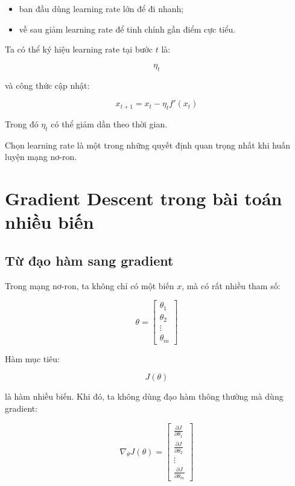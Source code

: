 \documentclass[12pt,a4paper]{report}
\begin{document}
\begin{itemize}
    \item ban đầu dùng learning rate lớn để đi nhanh;
    \item về sau giảm learning rate để tinh chỉnh gần điểm cực tiểu.
\end{itemize}

Ta có thể ký hiệu learning rate tại bước $t$ là:

\[
    \eta_t
\]

và công thức cập nhật:

\[
    x_{t+1}=x_t-\eta_t f'(x_t)
\]

Trong đó $\eta_t$ có thể giảm dần theo thời gian.

\begin{ghinho}
Chọn learning rate là một trong những quyết định quan trọng nhất khi huấn luyện mạng nơ-ron.
\end{ghinho}

\chapter{Gradient Descent trong bài toán nhiều biến}

\section{Từ đạo hàm sang gradient}

Trong mạng nơ-ron, ta không chỉ có một biến $x$, mà có rất nhiều tham số:

\[
    \theta =
    \begin{bmatrix}
    \theta_1\\
    \theta_2\\
    \vdots\\
    \theta_m
    \end{bmatrix}
\]

Hàm mục tiêu:

\[
    J(\theta)
\]

là hàm nhiều biến. Khi đó, ta không dùng đạo hàm thông thường mà dùng gradient:

\[
    \nabla_{\theta}J(\theta)
    =
    \begin{bmatrix}
    \frac{\partial J}{\partial \theta_1}\\
    \frac{\partial J}{\partial \theta_2}\\
    \vdots\\
    \frac{\partial J}{\partial \theta_m}
    \end{bmatrix}
\]
\end{document}
